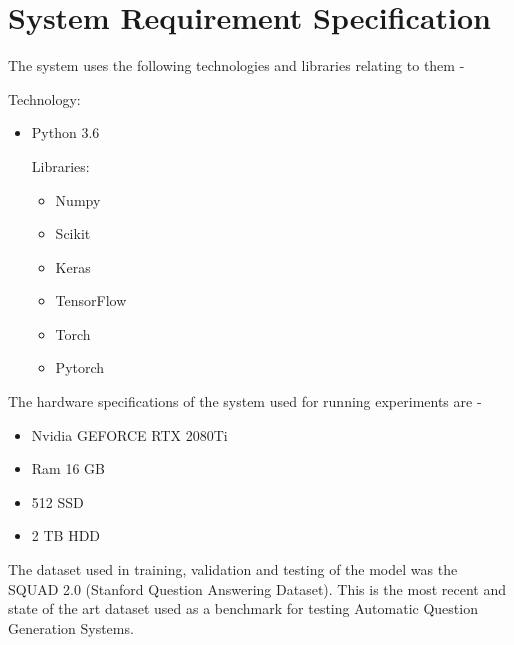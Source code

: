 \chapter{System Requirement Specification}

The system uses the following technologies and libraries relating to them -

Technology: 

\begin{itemize}

\item Python 3.6 


Libraries: 

\begin{itemize}

\item Numpy
\item Scikit
\item Keras
\item TensorFlow
\item Torch
\item Pytorch

\end{itemize}

\end{itemize}

The hardware specifications of the system used for running experiments are - 

\begin{itemize}

\item Nvidia GEFORCE RTX 2080Ti
\item Ram 16 GB
\item 512 SSD
\item 2 TB HDD

\end{itemize}

The dataset used in training, validation and testing of the model was the SQUAD
2.0 (Stanford Question Answering Dataset). This is the most recent and state of
the art dataset used as a benchmark for testing Automatic Question Generation
Systems. 

